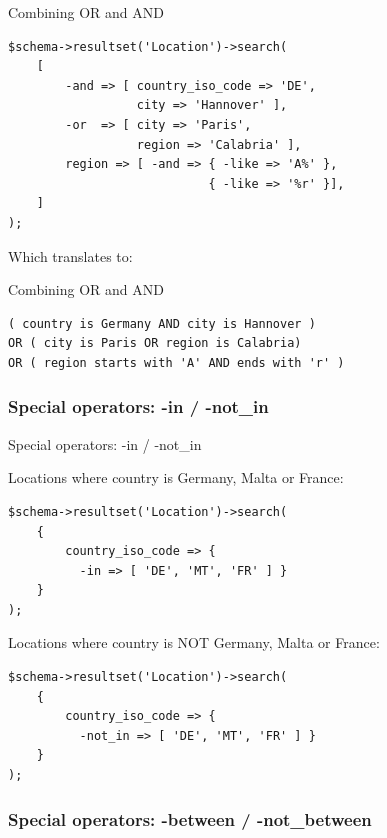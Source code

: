 \begin{frame}[fragile]{Combining OR and AND}

\begin{lstlisting}
$schema->resultset('Location')->search(
    [
        -and => [ country_iso_code => 'DE', 
                  city => 'Hannover' ],
        -or  => [ city => 'Paris', 
                  region => 'Calabria' ],
        region => [ -and => { -like => 'A%' }, 
                            { -like => '%r' }],
    ]
);
\end{lstlisting}
\end{frame}

Which translates to:

\begin{frame}[fragile]{Combining OR and AND}

\begin{lstlisting}
( country is Germany AND city is Hannover )
OR ( city is Paris OR region is Calabria)
OR ( region starts with 'A' AND ends with 'r' )
\end{lstlisting}

\end{frame}

\subsubsection{Special operators: -in / -not\_in}
\begin{frame}[fragile]{Special operators: -in / -not\_in}

Locations where country is Germany, Malta or France:

\begin{lstlisting}
$schema->resultset('Location')->search(
    {
        country_iso_code => { 
          -in => [ 'DE', 'MT', 'FR' ] }
    }
);
\end{lstlisting}

Locations where country is NOT Germany, Malta or France:

\begin{lstlisting}
$schema->resultset('Location')->search(
    {
        country_iso_code => { 
          -not_in => [ 'DE', 'MT', 'FR' ] }
    }
);
\end{lstlisting}
\end{frame}

\subsubsection{Special operators: -between / -not\_between}


